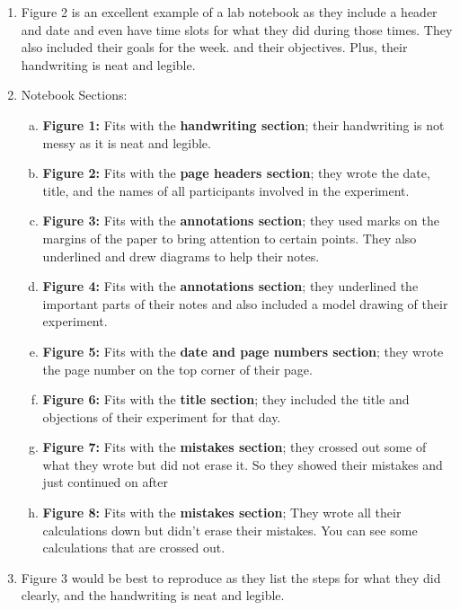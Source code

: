 \documentclass[idxtotoc,hyperref,openany]{labbook} %
\begin{document}

\begin{enumerate}
    \item Figure 2 is an excellent example of a lab notebook as they include a header and date and even have time slots for what they did during those times. They also included their goals for the week. and their objectives. Plus, their handwriting is neat and legible.
    \item Notebook Sections:
    \begin{enumerate}[(a)]
        \item \textbf{Figure 1:} Fits with the \textbf{handwriting section}; their handwriting is not messy as it is neat and legible.
        \item \textbf{Figure 2:} Fits with the \textbf{page headers section}; they wrote the date, title, and the names of all participants involved in the experiment.
        \item \textbf{Figure 3:} Fits with the \textbf{annotations section}; they used marks on the margins of the paper to bring attention to certain points. They also underlined and drew diagrams to help their notes.
        \item \textbf{Figure 4:} Fits with the \textbf{annotations section}; they underlined the important parts of their notes and also included a model drawing of their experiment.
        \item \textbf{Figure 5:} Fits with the \textbf{date and page numbers section}; they wrote the page number on the top corner of their page.
        \item \textbf{Figure 6:} Fits with the \textbf{title section}; they included the title and objections of their experiment for that day.
        \item \textbf{Figure 7:} Fits with the \textbf{mistakes section}; they crossed out some of what they wrote but did not erase it. So they showed their mistakes and just continued on after
        \item \textbf{Figure 8:} Fits with the \textbf{mistakes section}; They wrote all their calculations down but didn't erase their mistakes. You can see some calculations that are crossed out.
    \end{enumerate}
    \item Figure 3 would be best to reproduce as they list the steps for what they did clearly, and the handwriting is neat and legible.

\end{enumerate}
\end{document}
